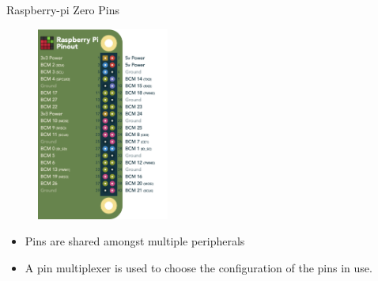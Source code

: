 \begin{frame}
   {Raspberry-pi Zero Pins}
   \begin{figure}[H]
      \includegraphics[height=2.5in]{IMAGES/rpi-pins}
   \end{figure}
   \begin{itemize}
      \item Pins are shared amongst multiple peripherals
      \item A pin multiplexer is used to choose the configuration of the pins in use.
   \end{itemize}
\end{frame}

\cprotect{}

